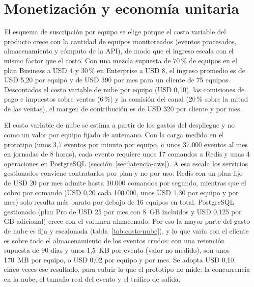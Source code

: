 \section{Monetización y economía unitaria}
El esquema de suscripción por equipo se elige porque el costo variable del producto crece con
la cantidad de equipos monitoreados (eventos procesados, almacenamiento y cómputo de la API), de
modo que el ingreso escala con el mismo factor que el costo. Con una mezcla supuesta de 70\,\% de
equipos en el plan Business a USD 4 y 30\,\% en Enterprise a USD 8, el ingreso promedio es de USD 5,20
por equipo y de USD 390 por mes para un cliente de 75 equipos. Descontados el costo variable de nube por
equipo (USD 0,10), las comisiones de pago e impuestos sobre ventas (6\,\%) y la comisión del canal
(20\,\% sobre la mitad de las ventas), el margen de contribución es de USD 320 por cliente y por mes.

El costo variable de nube se estima a partir de los gastos del despliegue y no como un valor por
equipo fijado de antemano. Con la carga medida en el prototipo (unos 3,7 eventos por minuto por equipo,
o unos 37.000 eventos al mes en jornadas de 8 horas), cada evento requiere unos 17 comandos a Redis y unas 4
operaciones en PostgreSQL (sección~\ref{sec:latencia-aws}). A esa escala los servicios gestionados conviene contratarlos por plan y no por uso:
Redis con un plan fijo de USD 20 por mes admite hasta 10.000 comandos por segundo,
mientras que el cobro por comando (USD 0,20 cada 100.000, unos USD 1,30 por equipo y por mes) solo resulta
más barato por debajo de 16 equipos en total. PostgreSQL gestionado (plan Pro de USD 25 por mes con 8~GB
incluidos y USD 0,125 por GB adicional) crece con el volumen almacenado.
Por eso la mayor parte del gasto de nube es fija y escalonada (tabla~\ref{tab:costo-nube}), y lo que varía
con el cliente es sobre todo el almacenamiento de los eventos crudos: con una retención supuesta de 90 días
y unos 1,5~KB por evento (valor no medido), son unos 170~MB por equipo, o USD 0,02 por equipo y por mes. Se
adopta USD 0,10, cinco veces ese resultado, para cubrir lo que el prototipo no mide: la concurrencia en la
nube, el tamaño real del evento y el tráfico de salida.

